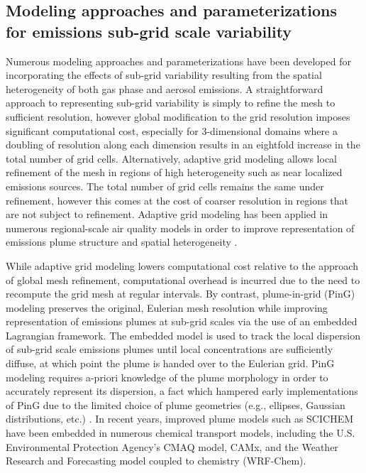 \subsection{Modeling approaches and parameterizations for emissions sub-grid scale variability}

Numerous modeling approaches and parameterizations have been developed for incorporating the effects of sub-grid variability resulting from the spatial heterogeneity of both gas phase and aerosol emissions. A straightforward approach to representing sub-grid variability is simply to refine the mesh to sufficient resolution, however global modification to the grid resolution imposes significant computational cost, especially for 3-dimensional domains where a doubling of resolution along each dimension results in an eightfold increase in the total number of grid cells. Alternatively, adaptive grid modeling allows local refinement of the mesh in regions of high heterogeneity such as near localized emissions sources. The total number of grid cells remains the same under refinement, however this comes at the cost of coarser resolution in regions that are not subject to refinement. Adaptive grid modeling has been applied in numerous regional-scale air quality models in order to improve representation of emissions plume structure and spatial heterogeneity \parencite{karamchandani_sub-grid_2011}.  

While adaptive grid modeling lowers computational cost relative to the approach of global mesh refinement, computational overhead is incurred due to the need to recompute the grid mesh at regular intervals. By contrast, plume-in-grid (PinG) modeling preserves the original, Eulerian mesh resolution while improving representation of emissions plumes at sub-grid scales via the use of an embedded Lagrangian framework. The embedded model is used to track the local dispersion of sub-grid scale emissions plumes until local concentrations are sufficiently diffuse, at which point the plume is handed over to the Eulerian grid. PinG modeling requires a-priori knowledge of the plume morphology in order to accurately represent its dispersion, a fact which hampered early implementations of PinG due to the limited choice of plume geometries (e.g., ellipses, Gaussian distributions, etc.) \parencite{karamchandani_sub-grid_2011}. In recent years, improved plume models such as SCICHEM have been embedded in numerous chemical transport models, including the U.S. Environmental Protection Agency's CMAQ model, CAMx, and the Weather Research and Forecasting model coupled to chemistry (WRF-Chem). 

